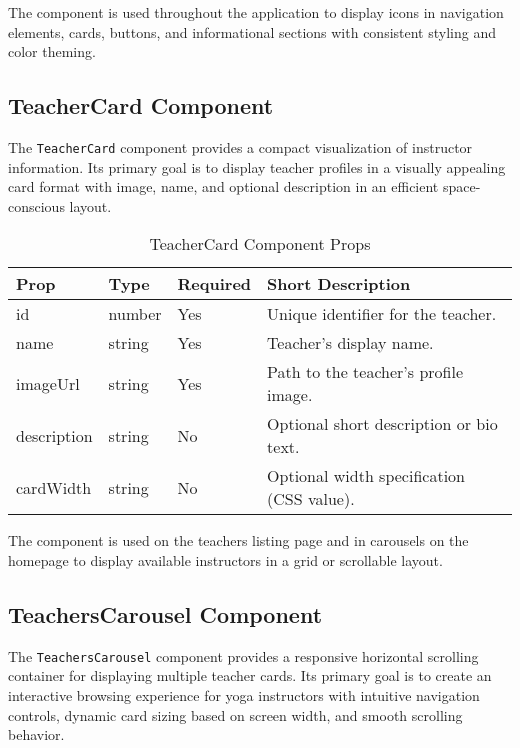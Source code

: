The component is used throughout the application to display icons in navigation elements, cards, buttons, and informational sections with consistent styling and color theming.

\subsection{TeacherCard Component}
The \texttt{TeacherCard} component provides a compact visualization of instructor information. Its primary goal is to display teacher profiles in a visually appealing card format with image, name, and optional description in an efficient space-conscious layout.

\begin{table}[H]
    \centering
    \setlength{\tabcolsep}{5pt}
    \renewcommand{\arraystretch}{1.2}
    \begin{tabular}{|p{2.2cm}|p{3.6cm}|p{1.5cm}|p{6cm}|}
        \hline
        \rowcolor{bluepoli!20}
        \textbf{Prop} & \textbf{Type} & \textbf{Required} & \textbf{Short Description} \\
        \hline
        id & number & Yes & Unique identifier for the teacher. \\
        \hline
        name & string & Yes & Teacher's display name. \\
        \hline
        imageUrl & string & Yes & Path to the teacher's profile image. \\
        \hline
        description & string & No & Optional short description or bio text. \\
        \hline
        cardWidth & string & No & Optional width specification (CSS value). \\
        \hline
    \end{tabular}
    \caption{TeacherCard Component Props}
\end{table}

The component is used on the teachers listing page and in carousels on the homepage to display available instructors in a grid or scrollable layout.

\subsection{TeachersCarousel Component}
The \texttt{TeachersCarousel} component provides a responsive horizontal scrolling container for displaying multiple teacher cards. Its primary goal is to create an interactive browsing experience for yoga instructors with intuitive navigation controls, dynamic card sizing based on screen width, and smooth scrolling behavior.

